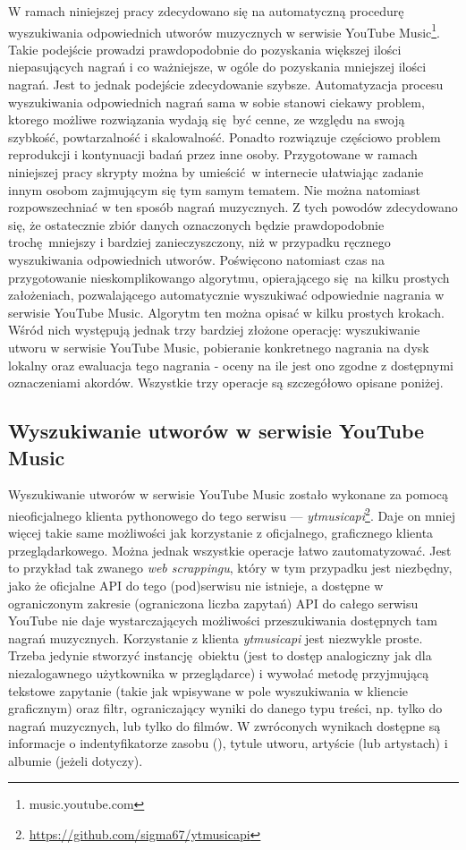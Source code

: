 W ramach niniejszej pracy zdecydowano się na automatyczną procedurę wyszukiwania odpowiednich utworów muzycznych w serwisie YouTube Music\footnote{music.youtube.com}. Takie podejście prowadzi prawdopodobnie do pozyskania większej ilości niepasujących nagrań i co ważniejsze, w ogóle do pozyskania mniejszej ilości nagrań. Jest to jednak podejście zdecydowanie szybsze. Automatyzacja procesu wyszukiwania odpowiednich nagrań sama w sobie stanowi ciekawy problem, ktorego możliwe rozwiązania wydają się być cenne, ze względu na swoją szybkość, powtarzalność i skalowalność.  Ponadto rozwiązuje częściowo problem reprodukcji i kontynuacji badań przez inne osoby.  Przygotowane w ramach niniejszej pracy skrypty można by umieścić w internecie ułatwiając zadanie innym osobom zajmującym się tym samym tematem. Nie można natomiast rozpowszechniać w ten sposób nagrań muzycznych. Z tych powodów zdecydowano się, że ostatecznie zbiór danych oznaczonych będzie prawdopodobnie trochę mniejszy i bardziej zanieczyszczony, niż w przypadku ręcznego wyszukiwania odpowiednich utworów. Poświęcono natomiast czas na przygotowanie nieskomplikowango algorytmu, opierającego się na kilku prostych założeniach, pozwalającego automatycznie wyszukiwać odpowiednie nagrania w serwisie YouTube Music. Algorytm ten można opisać w kilku prostych krokach. Wśród nich występują jednak trzy bardziej złożone operację: wyszukiwanie utworu w serwisie YouTube Music, pobieranie konkretnego nagrania na dysk lokalny oraz ewaluacja tego nagrania - oceny na ile jest ono zgodne z dostępnymi oznaczeniami akordów. Wszystkie trzy operacje są szczegółowo opisane poniżej.

\subsection{Wyszukiwanie utworów w serwisie YouTube Music}

Wyszukiwanie utworów w serwisie YouTube Music zostało wykonane za pomocą nieoficjalnego klienta pythonowego do tego serwisu --- \emph{ytmusicapi}\footnote{\url{https://github.com/sigma67/ytmusicapi}}.  Daje on mniej więcej takie same możliwości jak korzystanie z oficjalnego, graficznego klienta przeglądarkowego. Można jednak wszystkie operacje łatwo zautomatyzować. Jest to przykład tak zwanego \emph{web scrappingu}, który w tym przypadku jest niezbędny, jako że oficjalne API do tego (pod)serwisu nie istnieje, a dostępne w ograniczonym zakresie (ograniczona liczba zapytań) API do całego serwisu YouTube nie daje wystarczających możliwości przeszukiwania dostępnych tam nagrań muzycznych.  Korzystanie z klienta \emph{ytmusicapi} jest niezwykle proste. Trzeba jedynie stworzyć instancję obiektu  (jest to dostęp analogiczny jak dla niezalogawnego użytkownika w przeglądarce) i wywołać metodę  przyjmującą tekstowe zapytanie (takie jak wpisywane w pole wyszukiwania w kliencie graficznym) oraz filtr, ograniczający wyniki do danego typu treści, np.  tylko do nagrań muzycznych, lub tylko do filmów. W zwróconych wynikach dostępne są informacje o indentyfikatorze zasobu (), tytule utworu, artyście (lub artystach) i albumie (jeżeli dotyczy).

